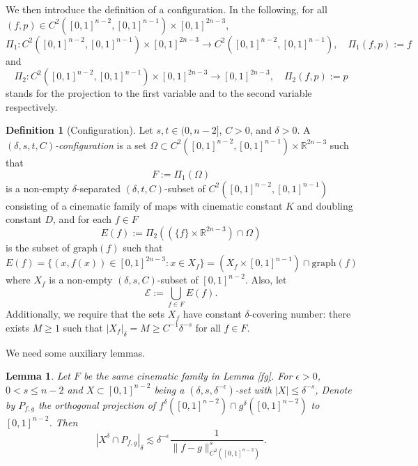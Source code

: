 \documentclass[11pt,a4paper,reqno]{amsart}
\newcommand{\1}{\mathbf{1}}
\numberwithin{equation}{section}
\theoremstyle{plain}
\newtheorem{lemma}[equation]{Lemma}
\theoremstyle{definition}
\newtheorem{definition}[equation]{Definition}
\theoremstyle{remark}
\begin{document}
We then introduce the definition of a configuration.
In the following, for all $(f,p) \in C^2([0,1]^{n-2},[0,1]^{n-1}) \times [0,1]^{2n-3}$,
$$\Pi_{1} \colon C^2([0,1]^{n-2},[0,1]^{n-1}) \times [0,1]^{2n-3}  \to C^2([0,1]^{n-2},[0,1]^{n-1}), \quad \Pi_{1}(f,p) := f $$
and
$$\Pi_{2} \colon C^2([0,1]^{n-2},[0,1]^{n-1}) \times [0,1]^{2n-3} \to [0,1]^{2n-3} , \quad \Pi_{2}(f,p) := p $$
stands for the projection to the first variable and to the second variable respectively.



\begin{definition}[Configuration]\label{d:config}
Let $s,t \in (0,n-2]$, $C>0$, and $\delta> 0$. A \emph{$(\delta,s,t,C)$-configuration} is a set $\Omega \subset C^2([0,1]^{n-2},[0,1]^{n-1}) \times \mathbb{R}^{2n-3}$ such that
$$F := \Pi_{1}(\Omega)$$
 is a non-empty $\delta$-separated $(\delta,t,C)$-subset of $C^2([0,1]^{n-2},[0,1]^{n-1})$ consisting of a cinematic family of maps with
cinematic constant $K$ and doubling constant $D$, and for each $f \in F$
$$E(f) := \Pi_{2}((\{f\} \times \mathbb{R}^{2n-3}) \cap \Omega)$$
is the subset of $\mbox{graph}(f)$
such that
\begin{equation}\label{xf}
  E(f) = \{(x,f(x)) \in [0,1]^{2n-3}: x \in X_f\} = (X_f \times [0,1]^{n-1}) \cap \mbox{graph}(f)
\end{equation}
where $X_f$ is a non-empty $(\delta,s,C)$-subset of $[0,1]^{n-2}$.
Also, let
 \begin{displaymath} \label{cale}
 \mathcal{E} := \bigcup_{f \in F} E(f).
 \end{displaymath}
 Additionally, we require that the sets $X_f$ have constant $\delta$-covering number: there exists $M \geq 1$ such that $|X_f|_\delta = M \ge C^{-1}\delta^{-s}$ for all $f \in F$.
\end{definition}

We need some auxiliary lemmas.

\begin{lemma} \label{shape}
  Let $F$ be the same cinematic family in Lemma \ref{fg}. For $\epsilon>0$, $0<s \le n-2$ and $X \subset [0,1]^{n-2}$ being a $(\delta,s,\delta^{-\epsilon})$-set with $|X| \le \delta^{-s}$, Denote by $P_{f,g}$ the orthogonal projection of
  $f^\delta([0,1]^{n-2}) \cap g^\delta([0,1]^{n-2})$ to $[0,1]^{n-2}$. Then
  \begin{equation}\label{prfg}
   |X^\delta \cap P_{f,g}|_\delta \lesssim \delta^{-\epsilon} \frac{1}{\|f-g\|_{C^2([0,1]^{n-2})}^s}.
  \end{equation}
\end{lemma}
\end{document}
